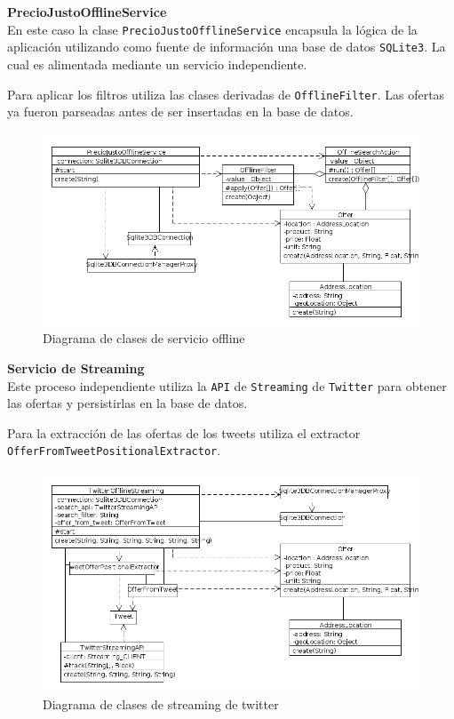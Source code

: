 \textbf{PrecioJustoOfflineService}\\

En este caso la clase \texttt{PrecioJustoOfflineService} encapsula la l\'ogica de la aplicaci\'on utilizando como fuente de informaci\'on una base de datos \texttt{SQLite3}. La cual es alimentada mediante un servicio independiente.

Para aplicar los filtros utiliza las clases derivadas de \texttt{OfflineFilter}. Las ofertas
ya fueron parseadas antes de ser insertadas en la base de datos.

\begin{figure}[h]
\centerline{\includegraphics[width=0.9\paperwidth]{./imgs/class_diagram_offline_service.png}}
\caption{Diagrama de clases de servicio offline}
\label{fig:class_offline_service}
\end{figure}

\textbf{Servicio de Streaming}\\

Este proceso independiente utiliza la \texttt{API} de \texttt{Streaming} de \texttt{Twitter} para obtener las ofertas y persistirlas en la base de datos.

Para la extracci\'on de las ofertas de los tweets utiliza el extractor \texttt{OfferFromTweetPositionalExtractor}.

\begin{figure}[h]
\centerline{\includegraphics[width=0.9\paperwidth]{./imgs/class_diagram_offline_streaming.png}}
\caption{Diagrama de clases de streaming de twitter}
\label{fig:class_offline_streaming}
\end{figure}

